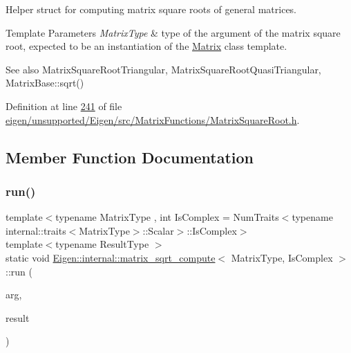 Helper struct for computing matrix square roots of general matrices. 


\begin{DoxyTemplParams}{Template Parameters}
{\em Matrix\+Type} & type of the argument of the matrix square root, expected to be an instantiation of the \hyperlink{group___core___module_class_eigen_1_1_matrix}{Matrix} class template.\\
\hline
\end{DoxyTemplParams}
\begin{DoxySeeAlso}{See also}
Matrix\+Square\+Root\+Triangular, Matrix\+Square\+Root\+Quasi\+Triangular, Matrix\+Base\+::sqrt() 
\end{DoxySeeAlso}


Definition at line \hyperlink{eigen_2unsupported_2_eigen_2src_2_matrix_functions_2_matrix_square_root_8h_source_l00241}{241} of file \hyperlink{eigen_2unsupported_2_eigen_2src_2_matrix_functions_2_matrix_square_root_8h_source}{eigen/unsupported/\+Eigen/src/\+Matrix\+Functions/\+Matrix\+Square\+Root.\+h}.



\subsection{Member Function Documentation}
\mbox{\label{struct_eigen_1_1internal_1_1matrix__sqrt__compute_a29c137f6d7c0cbe4df034be5aed427f6}} 
\subsubsection{\texorpdfstring{run()}{run()}\hspace{0.1cm}{\footnotesize\ttfamily [1/2]}}
{\footnotesize\ttfamily template$<$typename Matrix\+Type , int Is\+Complex = Num\+Traits$<$typename internal\+::traits$<$\+Matrix\+Type$>$\+::\+Scalar$>$\+::\+Is\+Complex$>$ \\
template$<$typename Result\+Type $>$ \\
static void \hyperlink{struct_eigen_1_1internal_1_1matrix__sqrt__compute}{Eigen\+::internal\+::matrix\+\_\+sqrt\+\_\+compute}$<$ Matrix\+Type, Is\+Complex $>$\+::run (\begin{DoxyParamCaption}\item[{const Matrix\+Type \&}]{arg,  }\item[{Result\+Type \&}]{result }\end{DoxyParamCaption})\hspace{0.3cm}{\ttfamily [static]}}



